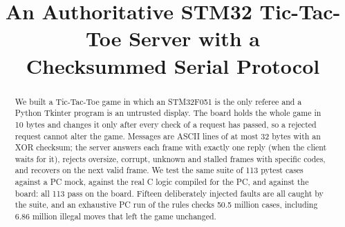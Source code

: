 \documentclass[conference]{IEEEtran}
\newcommand{\code}[1]{\texttt{\detokenize{#1}}}
\begin{document}
\title{An Authoritative STM32 Tic-Tac-Toe Server with a\\
Checksummed Serial Protocol}

\author{
}

\maketitle

\begin{abstract}
We built a Tic-Tac-Toe game in which an STM32F051 is the only referee and a Python
Tkinter program is an untrusted display. The board holds the whole game in 10 bytes and
changes it only after every check of a request has passed, so a rejected request cannot
alter the game. Messages are ASCII lines of at most 32 bytes with an XOR checksum; the
server answers each frame with exactly one reply (when the client waits for it), rejects oversize, corrupt, unknown and
stalled frames with specific \code{NACK} codes, and recovers on the next valid frame. We test
the same suite of 113 pytest cases against a PC mock, against the real C logic compiled for
the PC, and against the board: all 113 pass on the board. Fifteen deliberately
injected faults are all caught by the suite, and an exhaustive PC run of the rules checks
50.5 million cases, including 6.86 million illegal moves that left the game unchanged.
\end{abstract}















\end{document}
